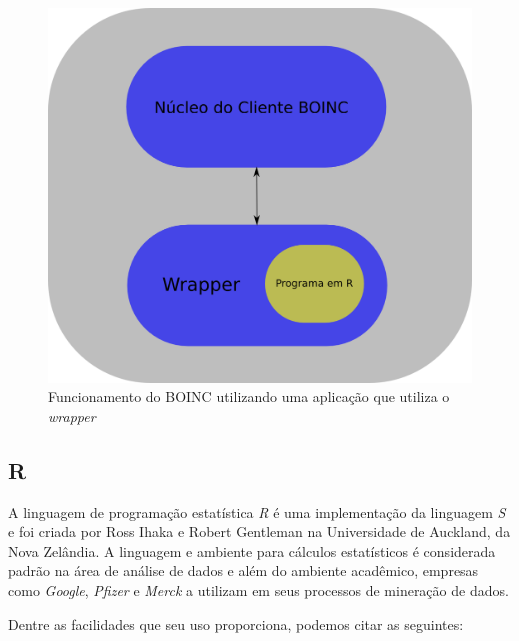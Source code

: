 \begin{figure}[!h]
  \centering
  \includegraphics[scale=0.3]{boinc-wrap.png}
  \caption{Funcionamento do BOINC utilizando uma aplicação que utiliza o \emph{wrapper}}
  \label{boinc-wrap}
\end{figure}


\subsection{R}

A linguagem de programação estatística \emph{R} é uma implementação da linguagem \emph{S} e foi criada por Ross Ihaka e Robert
Gentleman na Universidade de Auckland, da Nova Zelândia. A linguagem e ambiente para cálculos estatísticos é considerada
padrão %
na área de análise de dados e além do ambiente acadêmico, empresas como \emph{Google}, \emph{Pfizer} e \emph{Merck} a utilizam em seus
processos de mineração de dados. 

Dentre as facilidades que seu uso proporciona, podemos citar as seguintes:


